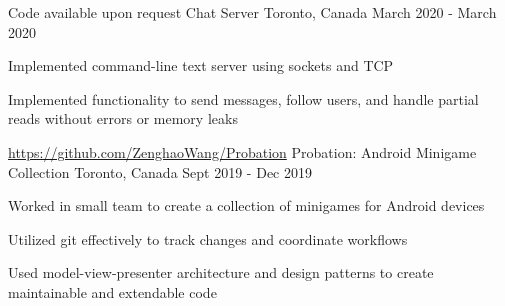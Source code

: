 \begin{cventries}
  \cventry
  {Code available upon request} %
  {Chat Server} %
  {Toronto, Canada} %
  {March 2020 - March 2020} %
  {
    \begin{cvitems} %
      \item {Implemented command-line text server using sockets and TCP}
      \item {Implemented functionality to send messages, follow users, and handle partial reads without errors or memory leaks}
    \end{cvitems}
  }
  \cventry
  {\url{https://github.com/ZenghaoWang/Probation}} %
  {Probation: Android Minigame Collection} %
  {Toronto, Canada} %
  {Sept 2019 - Dec 2019} %
  {
    \begin{cvitems} %
      \item {Worked in small team to create a collection of minigames for Android devices }
      \item {Utilized git effectively to track changes and coordinate workflows}
      \item {Used model-view-presenter architecture and design patterns to create maintainable and extendable code}
    \end{cvitems}
  }



\end{cventries}